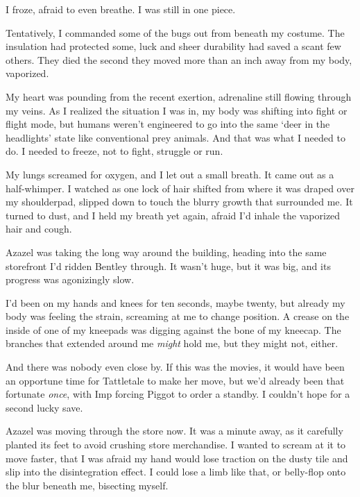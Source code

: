 I froze, afraid to even breathe.  I was still in one piece.



Tentatively, I commanded some of the bugs out from beneath my costume.  The insulation had protected some, luck and sheer durability had saved a scant few others.  They died the second they moved more than an inch away from my body, vaporized.



My heart was pounding from the recent exertion, adrenaline still flowing through my veins.  As I realized the situation I was in, my body was shifting into fight or flight mode, but humans weren't engineered to go into the same `deer in the headlights' state like conventional prey animals.  And that was what I needed to do.  I needed to freeze, not to fight, struggle or run.



My lungs screamed for oxygen, and I let out a small breath.  It came out as a half-whimper.  I watched as one lock of hair shifted from where it was draped over my shoulderpad, slipped down to touch the blurry growth that surrounded me.  It turned to dust, and I held my breath yet again, afraid I'd inhale the vaporized hair and cough.



Azazel was taking the long way around the building, heading into the same storefront I'd ridden Bentley through.  It wasn't huge, but it was big, and its progress was agonizingly slow.



I'd been on my hands and knees for ten seconds, maybe twenty, but already my body was feeling the strain, screaming at me to change position.  A crease on the inside of one of my kneepads was digging against the bone of my kneecap.  The branches that extended around me \emph{might} hold me, but they might not, either.



And there was nobody even close by.  If this was the movies, it would have been an opportune time for Tattletale to make her move, but we'd already been that fortunate \emph{once}, with Imp forcing Piggot to order a standby.  I couldn't hope for a second lucky save.



Azazel was moving through the store now.  It was a minute away, as it carefully planted its feet to avoid crushing store merchandise.  I wanted to scream at it to move faster, that I was afraid my hand would lose traction on the dusty tile and slip into the disintegration effect.  I could lose a limb like that, or belly-flop onto the blur beneath me, bisecting myself.



